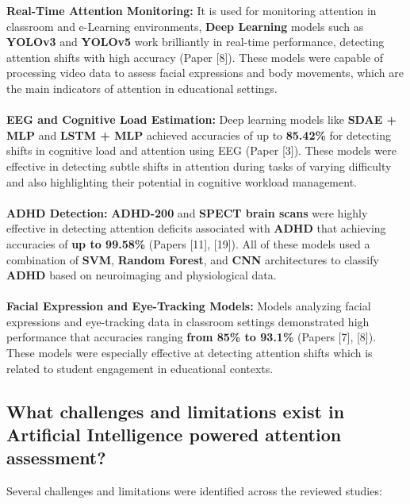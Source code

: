\documentclass[12pt]{article}
\begin{document}
\textbullet \textbf{Real-Time Attention Monitoring:} It is used for monitoring attention in classroom and e-Learning environments, \textbf{Deep Learning} models such as \textbf{YOLOv3} and \textbf{YOLOv5} work brilliantly in real-time performance, detecting attention shifts with high accuracy (Paper [8]). These models were capable of processing video data to assess facial expressions and body movements, which are the main indicators of attention in educational settings. \\ \\ 
\textbullet \textbf{EEG and Cognitive Load Estimation:} Deep learning models like \textbf{SDAE + MLP} and \textbf{LSTM + MLP} achieved accuracies of up to \textbf{85.42\%} for detecting shifts in cognitive load and attention using EEG (Paper [3]). These models were effective in detecting subtle shifts in attention during tasks of varying difficulty and also highlighting their potential in cognitive workload management.  \\ \\
\textbullet \textbf{ADHD Detection:} \textbf{ADHD-200} and \textbf{SPECT brain scans} were highly effective in detecting attention deficits associated with \textbf{ADHD} that achieving accuracies of \textbf{up to 99.58\%} (Papers [11], [19]). All of these models used a combination of \textbf{SVM}, \textbf{Random Forest}, and \textbf{CNN} architectures to classify \textbf{ADHD} based on neuroimaging and physiological data.  \\ \\
\textbullet \textbf{Facial Expression and Eye-Tracking Models:} Models analyzing facial expressions and eye-tracking data in classroom settings demonstrated high performance that accuracies ranging \textbf{from 85\% to 93.1\%} (Papers [7], [8]). These models were especially effective at detecting attention shifts which is related to student engagement in educational contexts.  \\ 

\subsection{ What challenges and limitations exist in Artificial Intelligence powered attention assessment?}
Several challenges and limitations were identified across the reviewed studies: \\
\end{document}
